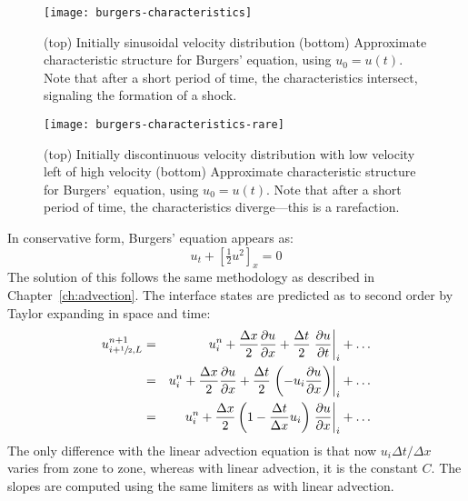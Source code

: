 \begin{figure}[t]
\centering
\texttt{[image: burgers-characteristics]}
\caption[Characteristics for shock initial conditions]
{\label{fig:burgers_char} (top) Initially sinusoidal
velocity distribution (bottom) Approximate characteristic
structure for Burgers' equation, using $u_0 = u(t)$.  Note that
after a short period of time, the characteristics intersect, signaling
the formation of a shock.}
\end{figure}

\begin{figure}[t]
\centering
\texttt{[image: burgers-characteristics-rare]}
\caption[Characteristics for rarefaction initial conditions]
        {\label{fig:burgers_char_rare} (top) Initially discontinuous
          velocity distribution with low velocity left of high
          velocity (bottom) Approximate characteristic structure for
          Burgers' equation, using $u_0 = u(t)$.  Note that after a
          short period of time, the characteristics diverge---this is
          a rarefaction.}
\end{figure}



In conservative form, Burgers' equation appears as:
\begin{equation}
u_t + \left [\tfrac{1}{2} u^2 \right ]_x = 0
\end{equation}
The solution of this follows the same methodology as described in
Chapter~\ref{ch:advection}.  The interface states are predicted as to
second order by Taylor expanding in space and time:
\begin{eqnarray}
u^{n+1}_{i+{\sfrac{1}{2}},L}
 &=& u^n_i + \frac{\Delta x}{2} \frac{\partial u}{\partial x}
    + \frac{\Delta t}{2} \left . \frac{\partial u}{\partial t} \right |_i
    + \ldots \\
 &=& u^n_i + \frac{\Delta x}{2} \frac{\partial u}{\partial x}
    + \frac{\Delta t}{2} \left . \left (-u_i \frac{\partial u}{\partial x}
         \right ) \right |_i
    + \ldots \\
 &=& u^n_i + \frac{\Delta x}{2}
   \left ( 1 - \frac{\Delta t}{\Delta x} u_i \right )
   \left . \frac{\partial u}{\partial x} \right |_i + \ldots
\end{eqnarray}
The only difference with the linear advection equation is that now
$u_i \Delta t/\Delta x$ varies from zone to zone, whereas with linear
advection, it is the constant $C$.  The slopes are computed using
the same limiters as with linear advection.

